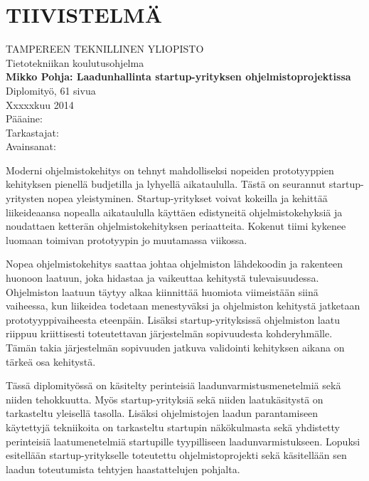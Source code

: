 \newpage
 
\setcounter{page}{1} %
 
\chapter*{TIIVISTELMÄ}
\begin{spacing}{1.0}
\textsf{TAMPEREEN TEKNILLINEN YLIOPISTO}\\
\textsf{Tietotekniikan koulutusohjelma}\\
{\bf \textsf{Mikko Pohja: Laadunhallinta startup-yrityksen ohjelmistoprojektissa}}\\
\textsf{Diplomityö, 61 sivua}\\
\textsf{Xxxxxkuu 2014}\\
\textsf{Pääaine: }\\
\textsf{Tarkastajat: }\\
\textsf{Avainsanat: }\\
\end{spacing}
 
\noindent
Moderni ohjelmistokehitys on tehnyt mahdolliseksi nopeiden prototyyppien kehityksen pienellä budjetilla ja lyhyellä aikataululla. Tästä on seurannut startup-yritysten nopea yleistyminen. Startup-yritykset voivat kokeilla ja kehittää liikeideaansa nopealla aikataululla käyttäen edistyneitä ohjelmistokehyksiä ja noudattaen ketterän ohjelmistokehityksen periaatteita. Kokenut tiimi kykenee luomaan toimivan prototyypin jo muutamassa viikossa.
 
\noindent
Nopea ohjelmistokehitys saattaa johtaa ohjelmiston lähdekoodin ja rakenteen huonoon laatuun, joka hidastaa ja vaikeuttaa kehitystä tulevaisuudessa. Ohjelmiston laatuun täytyy alkaa kiinnittää huomiota viimeistään siinä vaiheessa, kun liikeidea todetaan menestyväksi ja ohjelmiston kehitystä jatketaan prototyyppivaiheesta eteenpäin. Lisäksi startup-yrityksissä ohjelmiston laatu riippuu kriittisesti toteutettavan järjestelmän sopivuudesta kohderyhmälle. Tämän takia järjestelmän sopivuuden jatkuva validointi kehityksen aikana on tärkeä osa kehitystä.

\noindent
Tässä diplomityössä on käsitelty perinteisiä laadunvarmistusmenetelmiä sekä niiden tehokkuutta. Myös startup-yrityksiä sekä niiden laatukäsitystä on tarkasteltu yleisellä tasolla. Lisäksi ohjelmistojen laadun parantamiseen käytettyjä tekniikoita on tarkasteltu startupin näkökulmasta sekä yhdistetty perinteisiä laatumenetelmiä startupille tyypilliseen laadunvarmistukseen. Lopuksi esitellään startup-yritykselle toteutettu ohjelmistoprojekti sekä käsitellään sen laadun toteutumista tehtyjen haastattelujen pohjalta.

